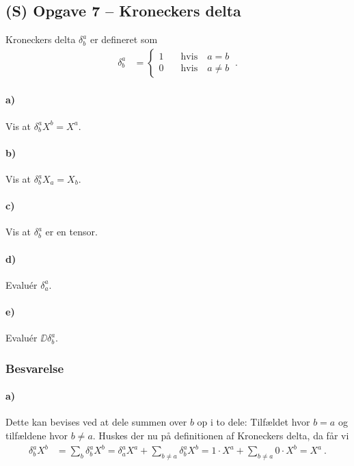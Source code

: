 \documentclass[../main.tex]{subfiles}
\begin{document}

\subsection{(S) Opgave 7 -- Kroneckers delta}
\setcounter{subsection}{7}
\setcounter{equation}{0}

Kroneckers delta $\delta^a_b$ er defineret som
\begin{align}
    \delta^a_b &=
        \begin{cases}
            1 \quad & \text{hvis} \quad a = b \\
            0 \quad & \text{hvis} \quad a \ne b
        \end{cases} \: .
\end{align}

\paragraph{a)} Vis at $\delta^a_b X^b = X^a$.
\paragraph{b)} Vis at $\delta^a_b X_a = X_b$.
\paragraph{c)} Vis at $\delta^a_b$ er en tensor.
\paragraph{d)} Evaluér $\delta^a_a$.
\paragraph{e)} Evaluér $\DD \delta^a_b$.


\subsubsection*{Besvarelse}


\paragraph{a)}

Dette kan bevises ved at dele summen over $b$ op i to dele: Tilfældet hvor $b = a$ og tilfældene hvor $b \ne a$. Huskes der nu på definitionen af Kroneckers delta, da får vi
\begin{align}
    \delta^a_b X^b &= \sum_b \delta^a_b X^b
        = \delta^a_a X^a + \sum_{b \ne a} \delta^a_b X^b
        = 1 \cdot X^a + \sum_{b \ne a} 0 \cdot X^b
        = X^a \: .
\end{align}
\end{document}
